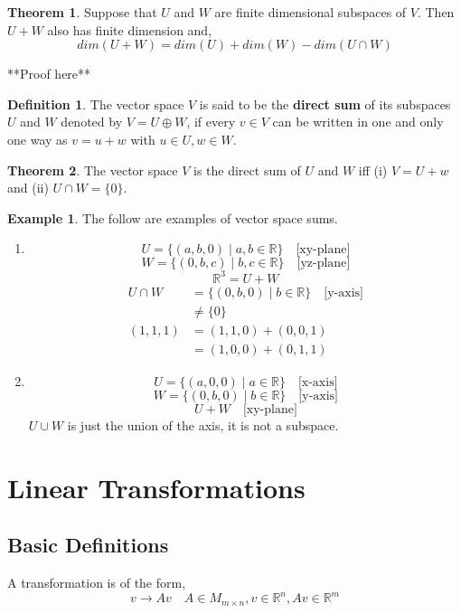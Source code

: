 \documentclass{report}
\theoremstyle{definition}
\newtheorem*{_def}{Definition}
\newtheorem{_thm}{Theorem}[section]
\newtheorem{ex}{Example}[section]
\theoremstyle{remark}
\begin{document}
\begin{_thm}
Suppose that $U$ and $W$ are finite dimensional subspaces of $V$.
Then $U+W$ also has finite dimension and,
\[dim(U+W)=dim(U)+dim(W)-dim(U\cap W)\]
\end{_thm}

**Proof here**

\begin{_def}
The vector space $V$ is said to be the \textbf{direct sum} of its subspaces $U$ and $W$ denoted by $V=U\oplus W$, if every $v\in V$ can be written in one and only one way as $v=u+w$ with $u\in U, w\in W$.
\end{_def}

\begin{_thm}
The vector space $V$ is the direct sum of $U$ and $W$ iff (i) $V=U+w$ and (ii) $U\cap W=\{0\}$.
\end{_thm}

\begin{ex}
The follow are examples of vector space sums.
\begin{enumerate}[1)]
 \item 
  \[U=\{(a,b,0)\mid a,b\in \mathbb{R}\} \quad \text{[xy-plane]}\]
  \[W=\{(0,b,c)\mid b,c\in \mathbb{R}\} \quad \text{[yz-plane]}\]
  \[\mathbb{R}^3=U+W\]
  \begin{align*}
  U\cap W&=\{(0,b,0)\mid b\in \mathbb{R}\} \quad \text{[y-axis]} \\
  &\neq \{0\} \\
  (1,1,1)&=(1,1,0)+(0,0,1) \\
  &=(1,0,0)+(0,1,1)
  \end{align*}  
 \item
  \[U=\{(a,0,0)\mid a\in \mathbb{R}\} \quad \text{[x-axis]}\]
  \[W=\{(0,b,0)\mid b\in \mathbb{R}\} \quad \text{[y-axis]}\]
  \[U+W\quad \text{[xy-plane]}\]
  $U\cup W$ is just the union of the axis, it is not a subspace.
\end{enumerate}
\end{ex}

\chapter{Linear Transformations}

\section{Basic Definitions}

A transformation is of the form,
\[v\rightarrow Av\quad A\in M_{m\times n}, v\in \mathbb{R}^n, Av\in \mathbb{R}^m\]
\end{document}
